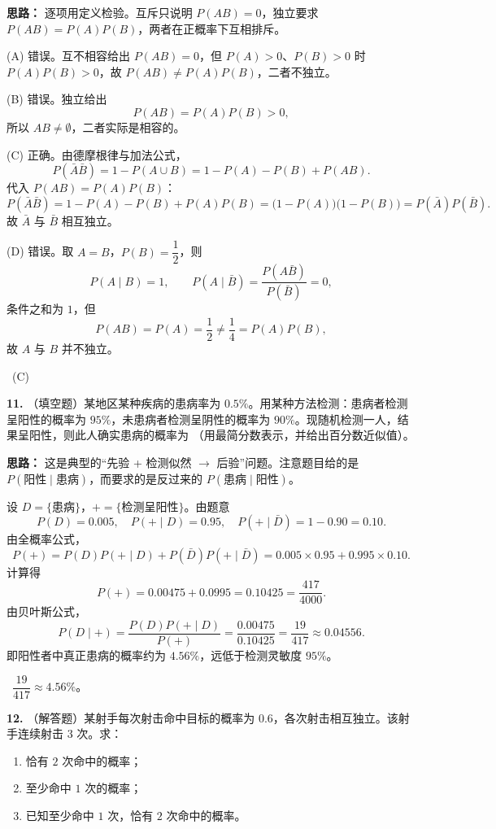 \ifshowsolutions%
\textbf{思路：} 逐项用定义检验。互斥只说明 $P(AB)=0$，独立要求 $P(AB)=P(A)P(B)$，两者在正概率下互相排斥。

(A) 错误。互不相容给出 $P(AB)=0$，但 $P(A)>0$、$P(B)>0$ 时 $P(A)P(B)>0$，故 $P(AB)\neq P(A)P(B)$，二者不独立。

(B) 错误。独立给出
\[
P(AB)=P(A)P(B)>0,
\]
所以 $AB\neq\emptyset$，二者实际是相容的。

(C) 正确。由德摩根律与加法公式，
\[
P(\bar A\bar B)=1-P(A\cup B)=1-P(A)-P(B)+P(AB).
\]
代入 $P(AB)=P(A)P(B)$：
\[
P(\bar A\bar B)=1-P(A)-P(B)+P(A)P(B)
=\bigl(1-P(A)\bigr)\bigl(1-P(B)\bigr)=P(\bar A)P(\bar B).
\]
故 $\bar A$ 与 $\bar B$ 相互独立。

(D) 错误。取 $A=B$，$P(B)=\dfrac12$，则
\[
P(A\mid B)=1,\qquad P(A\mid\bar B)=\frac{P(A\bar B)}{P(\bar B)}=0,
\]
条件之和为 $1$，但
\[
P(AB)=P(A)=\frac12\neq \frac14=P(A)P(B),
\]
故 $A$ 与 $B$ 并不独立。

\ (C)

\else \answerarea[8] \fi%

\textbf{11.} （填空题）某地区某种疾病的患病率为 $0.5\%$。用某种方法检测：患病者检测呈阳性的概率为 $95\%$，未患病者检测呈阴性的概率为 $90\%$。现随机检测一人，结果呈阳性，则此人确实患病的概率为 \underline{\qquad}（用最简分数表示，并给出百分数近似值）。

\ifshowsolutions%
\textbf{思路：} 这是典型的“先验 + 检测似然 $\to$ 后验”问题。注意题目给的是 $P(\text{阳性}\mid\text{患病})$，而要求的是反过来的 $P(\text{患病}\mid\text{阳性})$。

设 $D=\{\text{患病}\}$，$+=\{\text{检测呈阳性}\}$。由题意
\[
P(D)=0.005,\quad P(+ \mid D)=0.95,\quad P(+\mid\bar D)=1-0.90=0.10.
\]
由全概率公式，
\[
P(+)=P(D)P(+\mid D)+P(\bar D)P(+\mid\bar D)
=0.005\times0.95+0.995\times0.10.
\]
计算得
\[
P(+)=0.00475+0.0995=0.10425=\frac{417}{4000}.
\]
由贝叶斯公式，
\[
P(D\mid +)=\frac{P(D)P(+\mid D)}{P(+)}
=\frac{0.00475}{0.10425}
=\frac{19}{417}\approx0.04556.
\]
即阳性者中真正患病的概率约为 $4.56\%$，远低于检测灵敏度 $95\%$。

\ $\dfrac{19}{417}\approx4.56\%$。

\else \answerarea[8] \fi%

\textbf{12.} （解答题）某射手每次射击命中目标的概率为 $0.6$，各次射击相互独立。该射手连续射击 $3$ 次。求：
\begin{enumerate}[label=(\arabic*)]
    \item 恰有 $2$ 次命中的概率；
    \item 至少命中 $1$ 次的概率；
    \item 已知至少命中 $1$ 次，恰有 $2$ 次命中的概率。
\end{enumerate}

